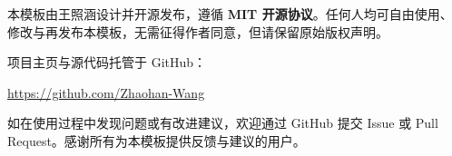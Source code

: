 \begin{acknowledgements}

本模板由王照涵设计并开源发布，遵循 \textbf{MIT 开源协议}。任何人均可自由使用、修改与再发布本模板，无需征得作者同意，但请保留原始版权声明。

项目主页与源代码托管于 GitHub：

\begin{center}
  \url{https://github.com/Zhaohan-Wang}
\end{center}

如在使用过程中发现问题或有改进建议，欢迎通过 GitHub 提交 Issue 或 Pull Request。感谢所有为本模板提供反馈与建议的用户。

\end{acknowledgements}
